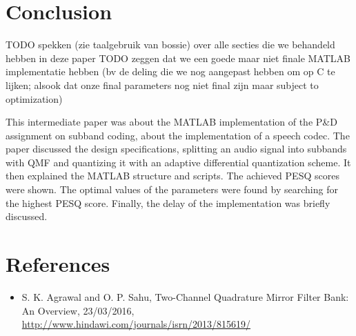 \documentclass[a4paper]{article}
\begin{document}
\section{Conclusion}
TODO spekken (zie taalgebruik van bossie) over alle secties die we behandeld hebben in deze paper
TODO zeggen dat we een goede maar niet finale MATLAB implementatie hebben (bv de deling die we nog aangepast hebben om op C te lijken; alsook dat onze final parameters nog niet final zijn maar subject to optimization)

This intermediate paper was about the MATLAB implementation of the P\&D assignment on subband coding, about the implementation of a speech codec. The paper discussed the design specifications, splitting an audio signal into subbands with QMF and quantizing it with an adaptive differential quantization scheme. It then explained the MATLAB structure and scripts. The achieved PESQ scores were shown. The optimal values of the parameters were found by searching for the highest PESQ score. Finally, the delay of the implementation was briefly discussed.

\section{References}
\begin{itemize}
\item S. K. Agrawal and O. P. Sahu, Two-Channel Quadrature Mirror Filter Bank: An Overview, 23/03/2016, \url{http://www.hindawi.com/journals/isrn/2013/815619/}
\end{itemize}
\end{document}
